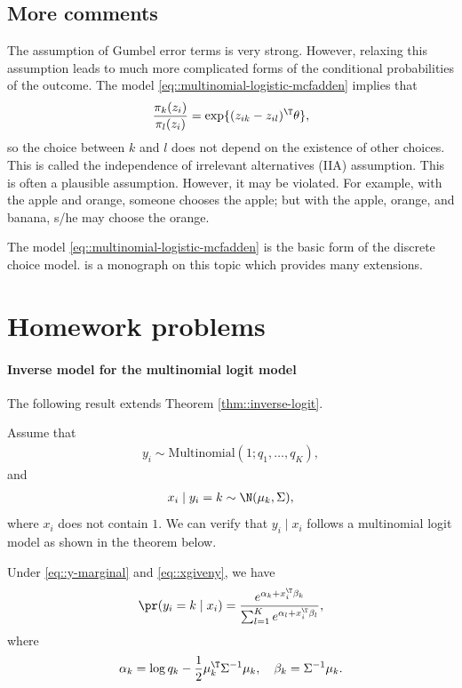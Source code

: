 \subsection{More comments}


The assumption of Gumbel error terms is very strong. However, relaxing this assumption leads to much more complicated forms of the conditional probabilities of the outcome. The model \eqref{eq::multinomial-logistic-mcfadden} implies that 
$$
\frac{  \pi_k(z_i) }{ \pi_l(z_i) } = \exp\{  (z_{ik} - z_{il})^{\T} \theta   \},
$$
so the choice between $k$ and $l$ does not depend on the existence of other choices. This is called the
independence of irrelevant alternatives (IIA) assumption. This is often a plausible assumption. However, it may be violated. For example, with the apple and orange, someone chooses the apple; but with the apple, orange, and banana, s/he may choose the orange.

The model \eqref{eq::multinomial-logistic-mcfadden}  is the basic form of the discrete choice model. \citet{train2009discrete} is a monograph on this topic which provides many extensions.


\section{Homework problems}


\paragraph{Inverse model for the  multinomial logit model}\label{hw18::inverse-multinom}


The following result extends Theorem \ref{thm::inverse-logit}. 

Assume that 
\begin{eqnarray}
y_{i}\sim\text{Multinomial}(1; q_1, \ldots, q_K),
\label{eq::y-marginal}
\end{eqnarray}
and
\begin{eqnarray}
x_{i}\mid y_{i}=k\sim\N(\mu_{k},\Sigma),
\label{eq::xgiveny}
\end{eqnarray} 
where $x_i$ does not contain $1$.
We can verify that $y_{i}\mid x_{i}$ follows a multinomial logit model as shown in the theorem below.  


\begin{theorem}
\label{thm::inverse-multinom-logit}
Under \eqref{eq::y-marginal} and \eqref{eq::xgiveny}, we have
$$
 \pr(y_i =k\mid x_i)   =   \frac{  e^{\alpha_k + x_i^{\T} \beta_k} }{   \sum_{l=1}^K e^{\alpha_l + x_i^{\T} \beta_l} } ,
$$
where
\begin{eqnarray*}
\label{eq::alpha-beta-lda}
\alpha_k = \log q_k -\frac{1}{2} \mu_k^{\T}\Sigma^{-1}\mu_k  ,\quad
\beta_k = \Sigma^{-1} \mu_k.
\end{eqnarray*}
\end{theorem}


